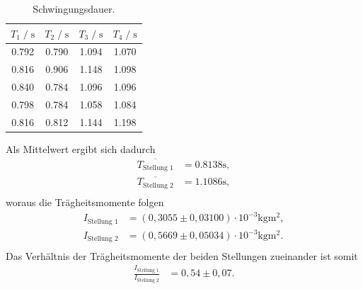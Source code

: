 \begin{table}[H]
    \centering
        \caption{Schwingungsdauer.}
        \label{tab:schwingdauer}
        \begin{tabular}{c c c c}
        \toprule
        $T_1 \;/\; \si{\second}$ & $T_2 \;/\; \si{\second}$ & $T_3 \;/\; \si{\second}$ & $T_4 \;/\; \si{\second}$ \\
        \midrule
        0.792 & 0.790 & 1.094 & 1.070 \\
        0.816 & 0.906 & 1.148 & 1.098 \\
        0.840 & 0.784 & 1.096 & 1.096 \\
        0.798 & 0.784 & 1.058 & 1.084 \\
        0.816 & 0.812 & 1.144 & 1.198 \\
        \bottomrule
    \end{tabular}
\end{table}


Als Mittelwert ergibt sich dadurch
\begin{align*}
  \overline{T_{\text{Stellung 1}}} &= 0.8138 \si{\second}, \\
  \overline{T_{\text{Stellung 2}}} &= 1.1086 \si{\second}, \\
\end{align*}
woraus die Trägheitsmomente folgen %
\begin{align*}
  I_{\text{Stellung 1}} &= (0,3055\pm 0,03100) \cdot 10^{-3} \si{\kilogram\meter^2}, \\
  I_{\text{Stellung 2}} &= (0,5669\pm 0,05034) \cdot 10^{-3} \si{\kilogram\meter^2}. \\
\end{align*}
Das Verhältnis der Trägheitsmomente der beiden Stellungen zueinander ist somit
\begin{align*}
  \frac{I_{\text{Stellung 1}}}{I_{\text{Stellung 2}}} &= 0,54\pm 0,07.  \\
\end{align*}


\newpage

